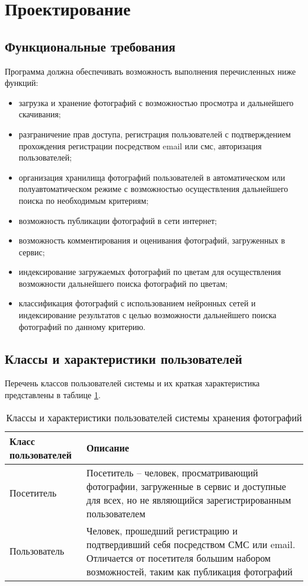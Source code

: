 \sectioncounter
\section{Проектирование}

\subsection{Функциональные требования}

Программа должна обеспечивать возможность выполнения перечисленных ниже функций:
\begin{itemize}
  \item загрузка и хранение фотографий с возможностью просмотра и дальнейшего скачивания;
  \item разграничение прав доступа, регистрация пользователей с подтверждением прохождения регистрации посредством email или смс, авторизация пользователей;
  \item организация хранилища фотографий пользователей в автоматическом или полуавтоматическом режиме с возможностью осуществления дальнейшего поиска по необходимым критериям;
  \item возможность публикации фотографий в сети интернет;
  \item возможность комментирования и оценивания фотографий, загруженных в сервис;
  \item индексирование загружаемых фотографий по цветам для осуществления возможности дальнейшего поиска фотографий по цветам;
  \item классификация фотографий с использованием нейронных сетей и индексирование результатов с целью возможности дальнейшего поиска фотографий по данному критерию.
\end{itemize}

\subsection{Классы и характеристики пользователей}

Перечень классов пользователей системы и их краткая характеристика представлены в таблице \ref{user-classes-table}.
\begin{table}[H]
  \caption{\onehalfspacing Классы и характеристики пользователей системы хранения фотографий}\label{user-classes-table}
  \begin{tabular}{|p{4cm}|p{12cm}|}
  \hline Класс пользователей & Описание \\ 
  \hline Посетитель & Посетитель – человек, просматривающий фотографии, загруженные в сервис и доступные для всех, но не являющийся зарегистрированным пользователем \\ 
  \hline Пользователь & Человек, прошедший регистрацию и подтвердивший себя посредством СМС или email. Отличается от посетителя большим набором возможностей, таким как публикация фотографий \\ 
  \hline
  \end{tabular}
\end{table}

